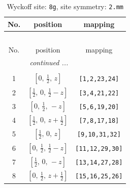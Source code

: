 \documentclass[fleqn,8pt]{jsarticle}
\begin{document}
\begin{longtable}{ccc}
\caption{Wyckoff site: {\tt 8g}, site symmetry: {\tt 2.mm}}
 \\
 \hline \hline
No. & position & mapping \\ \hline \endfirsthead

\multicolumn{2}{l}{\tablename\ \thetable{}} \\
 \hline \hline
No. & position & mapping \\ \hline \endhead

 \hline \hline
\multicolumn{2}{r}{\footnotesize\it continued ...} \\ \endfoot

 \hline \hline
\multicolumn{2}{r}{} \\ \endlastfoot

1 & $\left[ 0,\, \frac{1}{2},\, z \right]$ & {\tt [1,2,23,24]} \\ \hline
2 & $\left[ \frac{1}{2},\, 0,\, \frac{1}{2} - z \right]$ & {\tt [3,4,21,22]} \\ \hline
3 & $\left[ 0,\, \frac{1}{2},\, - z \right]$ & {\tt [5,6,19,20]} \\ \hline
4 & $\left[ \frac{1}{2},\, 0,\, z + \frac{1}{2} \right]$ & {\tt [7,8,17,18]} \\ \hline
5 & $\left[ \frac{1}{2},\, 0,\, z \right]$ & {\tt [9,10,31,32]} \\ \hline
6 & $\left[ 0,\, \frac{1}{2},\, \frac{1}{2} - z \right]$ & {\tt [11,12,29,30]} \\ \hline
7 & $\left[ \frac{1}{2},\, 0,\, - z \right]$ & {\tt [13,14,27,28]} \\ \hline
8 & $\left[ 0,\, \frac{1}{2},\, z + \frac{1}{2} \right]$ & {\tt [15,16,25,26]} \\
\end{longtable}
\renewcommand{\arraystretch}{1.2}
\end{document}

